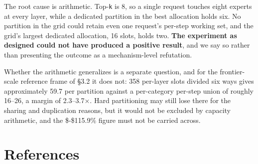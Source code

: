 \documentclass[
  10pt,
  letterpaper,
  10pt]{article}
\begin{document}
The root cause is arithmetic. Top-\texttt{k} is 8, so a single request
touches eight experts at every layer, while a dedicated partition in the
best allocation holds six. No partition in the grid could retain even
one request's per-step working set, and the grid's largest dedicated
allocation, 16 slots, holds two. \textbf{The experiment as designed
could not have produced a positive result}, and we say so rather than
presenting the outcome as a mechanism-level refutation.

Whether the arithmetic generalizes is a separate question, and for the
frontier-scale reference frame of §3.2 it does not: 358 per-layer slots
divided six ways gives approximately 59.7 per partition against a
per-category per-step union of roughly 16--26, a margin of
2.3--3.7\(\times\). Hard partitioning may still lose there for the
sharing and duplication reasons, but it would not be excluded by
capacity arithmetic, and the \$-\$115.9\% figure must not be carried
across.

\section*{References}\label{bibliography}
\end{document}
